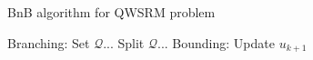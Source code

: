 \documentclass{beamer}
\begin{document}
\begin{frame}[fragile]
    \begin{block}{BnB algorithm for QWSRM problem}
        \begin{algorithmic}
            \State Branching:
            \State\quad{} Set $\mathcal{Q}$...
            \State\quad{} Split $\mathcal{Q}$...
            \State Bounding:
            \State\quad{} Update $u_{k+1}$
      \end{algorithmic}
  \end{block}
\end{frame}
\end{document}
